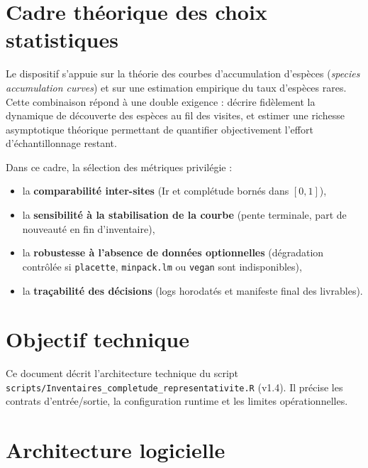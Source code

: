 \documentclass[11pt,a4paper]{article}
\begin{document}
\section{Cadre théorique des choix statistiques}
Le dispositif s'appuie sur la théorie des courbes d'accumulation d'espèces
(\textit{species accumulation curves}) et sur une estimation empirique du taux d'espèces
rares. Cette combinaison répond à une double exigence : décrire fidèlement la dynamique de
découverte des espèces au fil des visites, et estimer une richesse asymptotique théorique
permettant de quantifier objectivement l'effort d'échantillonnage restant.

Dans ce cadre, la sélection des métriques privilégie :
\begin{itemize}[leftmargin=1.2cm]
  \item la \textbf{comparabilité inter-sites} (Ir et complétude bornés dans $[0,1]$),
  \item la \textbf{sensibilité à la stabilisation de la courbe} (pente terminale, part de nouveauté en fin d'inventaire),
  \item la \textbf{robustesse à l'absence de données optionnelles} (dégradation contrôlée si \texttt{placette}, \texttt{minpack.lm} ou \texttt{vegan} sont indisponibles),
  \item la \textbf{traçabilité des décisions} (logs horodatés et manifeste final des livrables).
\end{itemize}

\section{Objectif technique}
Ce document décrit l'architecture technique du script
\texttt{scripts/Inventaires\_completude\_representativite.R} (v1.4).
Il précise les contrats d'entrée/sortie, la configuration runtime
et les limites opérationnelles.

\section{Architecture logicielle}
\end{document}

